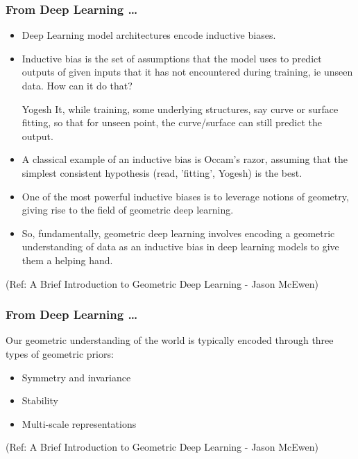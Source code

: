 \begin{frame}[fragile]\frametitle{From Deep Learning \ldots}


\begin{itemize}
\item Deep Learning model architectures encode inductive biases.
\item Inductive bias is the set of assumptions that the model uses to predict outputs of given inputs that it has not encountered during training, ie unseen data. How can it do that? 
\item [Yogesh] It, while training, some underlying structures, say curve or surface fitting, so that for unseen point, the curve/surface can still predict the output.
\item A classical example of an inductive bias is Occam's razor, assuming that the simplest consistent hypothesis (read, 'fitting', Yogesh) is the best.
\item One of the most powerful inductive biases is to leverage notions of geometry, giving rise to the field of geometric deep learning.
\item So, fundamentally, geometric deep learning involves encoding a geometric understanding of data as an inductive bias in deep learning models to give them a helping hand.
\end{itemize}
	  
{\tiny (Ref: A Brief Introduction to Geometric Deep Learning - Jason McEwen)}

\end{frame}

\begin{frame}[fragile]\frametitle{From Deep Learning \ldots}

Our geometric understanding of the world is typically encoded through three types of geometric priors:

	\begin{itemize}
	\item Symmetry and invariance
	\item Stability
	\item Multi-scale representations
	\end{itemize}

{\tiny (Ref: A Brief Introduction to Geometric Deep Learning - Jason McEwen)}

\end{frame}

